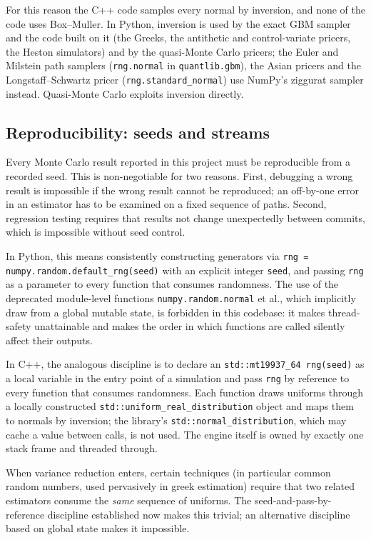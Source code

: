\documentclass[11pt,a4paper]{article}
\theoremstyle{plain}
\theoremstyle{definition}
\theoremstyle{remark}
\begin{document}
For this reason the C++ code samples every normal by inversion, and
none of the code uses Box--Muller. In Python, inversion is used by the
exact GBM sampler and the code built on it (the Greeks, the antithetic
and control-variate pricers, the Heston simulators) and by the
quasi-Monte Carlo pricers; the Euler and Milstein path samplers
(\texttt{rng.normal} in \texttt{quantlib.gbm}), the Asian pricers and
the Longstaff--Schwartz pricer (\texttt{rng.standard\_normal}) use
NumPy's ziggurat sampler instead. Quasi-Monte Carlo exploits inversion
directly.

\subsection{Reproducibility: seeds and streams}
\label{sec:seeds}

Every Monte Carlo result reported in this project must be reproducible
from a recorded seed. This is non-negotiable for two reasons. First,
debugging a wrong result is impossible if the wrong result cannot be
reproduced; an off-by-one error in an estimator has to be examined on a
fixed sequence of paths. Second, regression testing requires that
results not change unexpectedly between commits, which is impossible
without seed control.

In Python, this means consistently constructing generators via
\texttt{rng = numpy.random.default\_rng(seed)} with an explicit integer
\texttt{seed}, and passing \texttt{rng} as a parameter to every
function that consumes randomness. The use of the deprecated
module-level functions \texttt{numpy.random.normal} et al., which
implicitly draw from a global mutable state, is forbidden in this
codebase: it makes thread-safety unattainable and makes the order in
which functions are called silently affect their outputs.

In C++, the analogous discipline is to declare an
\texttt{std::mt19937\_64 rng(seed)} as a local variable in the entry
point of a simulation and pass \texttt{rng} by reference to every
function that consumes randomness. Each function draws uniforms through
a locally constructed \texttt{std::uniform\_real\_distribution} object
and maps them to normals by inversion; the library's
\texttt{std::normal\_distribution}, which may cache a value between
calls, is not used. The engine itself is owned by exactly one stack
frame and threaded through.

When variance reduction enters, certain techniques (in
particular common random numbers, used pervasively in greek estimation)
require that two related estimators consume the \emph{same} sequence of
uniforms. The seed-and-pass-by-reference discipline established now
makes this trivial; an alternative discipline based on global state
makes it impossible.
\end{document}
